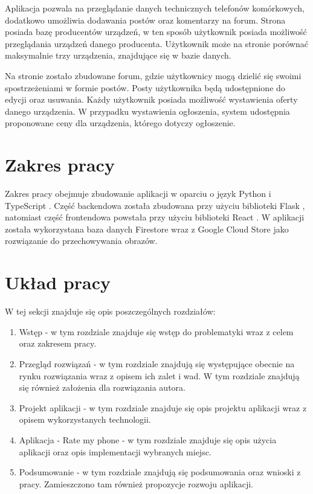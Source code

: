 Aplikacja pozwala na przeglądanie danych technicznych telefonów komórkowych, dodatkowo umożliwia dodawania postów oraz komentarzy na forum. Strona posiada bazę producentów urządzeń, w ten sposób użytkownik posiada możliwość przeglądania urządzeń danego producenta. Użytkownik może na stronie porównać maksymalnie trzy urządzenia, znajdujące się w bazie danych.

Na stronie zostało zbudowane forum, gdzie użytkownicy mogą dzielić się swoimi spostrzeżeniami w formie postów. Posty użytkownika będą udostępnione do edycji oraz usuwania. Każdy użytkownik posiada możliwość wystawienia oferty danego urządzenia. W przypadku wystawienia ogłoszenia, system udostępnia proponowane ceny dla urządzenia, którego dotyczy ogłoszenie.

\section{Zakres pracy}
Zakres pracy obejmuje zbudowanie aplikacji w oparciu o język Python \cite{python} i TypeScript \cite*{TypeScript}. Część backendowa została zbudowana przy użyciu biblioteki Flask \cite{flask}, natomiast część frontendowa powstała przy użyciu biblioteki React \cite{React}. W aplikacji została wykorzystana baza danych Firestore wraz z Google Cloud Store jako rozwiązanie do przechowywania obrazów. 

\section{Układ pracy}
W tej sekcji znajduje się opis poszczególnych rozdziałów:
\begin{enumerate}
  \item Wstęp - w tym rozdziale znajduje się wstęp do problematyki wraz z celem oraz zakresem pracy.
  \item Przegląd rozwiązań - w tym rozdziale znajdują się występujące obecnie na rynku rozwiązania wraz z opisem ich zalet i wad. W tym rozdziale znajdują się również założenia dla rozwiązania autora.
  \item Projekt aplikacji - w tym rozdziale znajduje się opis projektu aplikacji wraz z opisem wykorzystanych technologii.
  \item Aplikacja - Rate my phone - w tym rozdziale znajduje się opis użycia aplikacji oraz opis implementacji wybranych miejsc.
  \item Podsumowanie - w tym rozdziale znajdują się podsumowania oraz wnioski z pracy. Zamieszczono tam również propozycje rozwoju aplikacji.
\end{enumerate}
